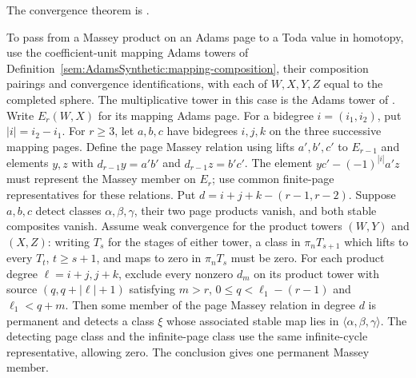 \begin{theorem}
\label{sem:Literature:moss-comparison}
The convergence theorem is \cite[Theorem 1.1, Definitions 2.3--2.4 and Example 5.1]{BelmontKong2024}.\par

To pass from a Massey product on an Adams page to a Toda value in
homotopy, use the coefficient-unit mapping Adams towers of
Definition~\ref{sem:AdamsSynthetic:mapping-composition}, their composition
pairings and convergence identifications, with each of $W,X,Y,Z$
equal to the completed sphere. The multiplicative tower in this case is
the Adams tower of \cite[Example 5.1]{BelmontKong2024}. Write
$E_r(W,X)$ for its mapping Adams page. For a bidegree $i=(i_1,i_2)$,
put $|i|=i_2-i_1$.
For $r\ge3$, let $a,b,c$ have bidegrees $i,j,k$ on the three
successive mapping pages. Define the page Massey relation using lifts
$a',b',c'$ to $E_{r-1}$ and elements $y,z$ with
$d_{r-1}y=a'b'$ and $d_{r-1}z=b'c'$. The element
$yc'-(-1)^{|i|}a'z$ must represent the Massey member on $E_r$;
use common finite-page representatives for these relations.
Put $d=i+j+k-(r-1,r-2)$.
Suppose $a,b,c$ detect classes $\alpha,\beta,\gamma$,
their two page products vanish, and both stable composites vanish.
Assume weak convergence for the product towers $(W,Y)$ and $(X,Z)$:
writing $T_s$ for the stages of either tower, a class in
$\pi_nT_{s+1}$ which lifts to every $T_t$, $t\ge s+1$,
and maps to zero in $\pi_nT_s$ must be zero.
For each product degree $\ell=i+j,j+k$, exclude every nonzero
$d_m$ on its product tower with source $(q,q+|\ell|+1)$ satisfying
$m>r$, $0\le q<\ell_1-(r-1)$ and $\ell_1<q+m$.
Then some member of the page Massey relation in degree $d$ is permanent
and detects a class $\xi$ whose associated stable map lies in
$\langle\alpha,\beta,\gamma\rangle$.
The detecting page class and the infinite-page class use the same
infinite-cycle representative, allowing zero. The conclusion gives
one permanent Massey member.


\end{theorem}


